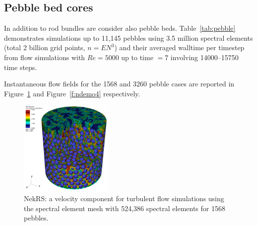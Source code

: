 \documentclass{anstrans}
\begin{document}
\subsection{Pebble bed cores}

In addition to rod bundles are consider also pebble beds. Table~\ref{tab:pebble} demonstrates simulations up to 11,145 pebbles using 3.5 million spectral elements (total 2 billion grid points, $n = EN^3$)  and their averaged walltime per timestep from flow simulations with $Re= 5000$ up to time $=7$ involving 14000--15750 time steps.

 \begin{table}
   \caption{NekRS: All-Hex Meshes for Pebbles, Based on Voronoi Cell strategy, and Simulation Timings (seconds per step) on GPUs
    of Turbulent Flow Simulations with $Re = 5000$.}
   \label{tab:pebble}
 \end{table}

Instantaneous flow fields for the 1568 and 3260 pebble cases are reported in Figure~\ref{f:ndemo3} and
Figure~\ref{f:ndemo4} respectively.

\begin{figure}[!h]
\centering
\includegraphics[clip=true,width=0.4\textwidth]{Figures/ndemo_r3}
\caption{NekRS: a velocity component for turbulent flow simulations using the
spectral element mesh with 524,386 spectral elements for 1568 pebbles. }
\label{f:ndemo3}
\end{figure}
\end{document}
